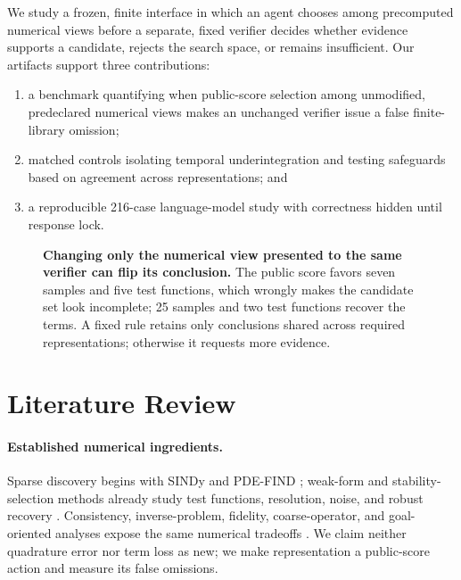 \documentclass{article}
\begin{document}
We study a frozen, finite interface in which an agent chooses among precomputed numerical views before
a separate, fixed verifier decides whether evidence supports a candidate, rejects the search space,
or remains insufficient. Our artifacts support three contributions:
\begin{enumerate}[leftmargin=*,nosep]
  \item a benchmark quantifying when public-score selection among unmodified, predeclared numerical
  views makes an unchanged verifier issue a false finite-library omission;
  \item matched controls isolating temporal underintegration and testing safeguards based
  on agreement across representations; and
  \item a reproducible 216-case language-model study with correctness hidden until response lock.
\end{enumerate}

\begin{figure}[t]
\centering

\caption{\textbf{Changing only the numerical view presented to the same verifier can flip its
conclusion.} The public score favors seven samples and five test functions, which wrongly makes the
candidate set look incomplete; 25 samples and two test functions recover the terms. A fixed rule
retains only conclusions shared across required representations; otherwise it requests more evidence.}
\label{fig:story}
\end{figure}

\section{Literature Review}
\enlargethispage{-2\baselineskip}

\paragraph{Established numerical ingredients.}
Sparse discovery begins with SINDy and PDE-FIND \citep{brunton2016sindy,rudy2017pdefind}; weak-form
and stability-selection methods already study test functions, resolution, noise, and robust recovery
\citep{messenger2021wsindy,tang2023weakident,chen2026fourierwsindy,gurevich2019robust,maddu2022pdestride}.
Consistency, inverse-problem, fidelity, coarse-operator, and goal-oriented analyses expose the same
numerical tradeoffs \citep{messenger2022asymptotic,tran2025testfunctions,kaipio2007inverse,
wu2023dmfdal,agdestein2022filtered,bakarji2020coarse,becker2001dwr}. We claim neither quadrature error
nor term loss as new; we make representation a public-score action and measure its false omissions.
\end{document}
